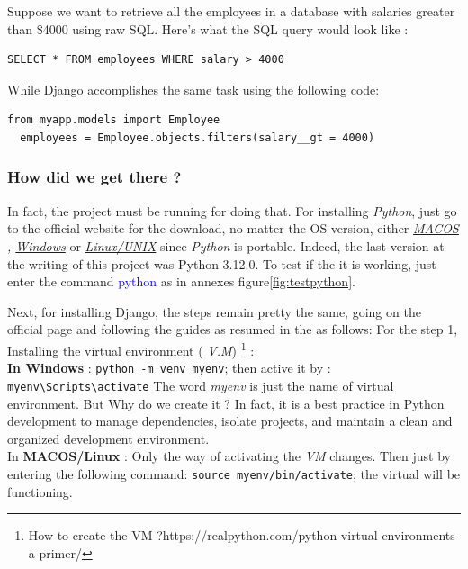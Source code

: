 \documentclass[12pt,a4paper, oneside]{book}
\begin{document}
	Suppose we want to retrieve all the employees in a database with salaries greater than \$4000 using raw SQL. Here's what the SQL query would look like : 	
\begin{lstlisting}[style=htmlcssjsstyle]
 SELECT * FROM employees WHERE salary > 4000
\end{lstlisting}
  While Django accomplishes the same task using the following code:
\begin{lstlisting}[style=stylejupyter]
from myapp.models import Employee
  employees = Employee.objects.filters(salary__gt = 4000)
\end{lstlisting}
    \subsubsection*{How did we get there ?}
   In fact, the project must be running for doing that. For installing \textit{Python}, just go to the official website for the  download, no matter the OS version, either \textit{ \href{https://www.python.org/downloads/macos/}{MACOS} , \href{https://www.python.org/downloads/windows/}{Windows} } or \href{https://www.python.org/downloads/source/}{\textit{Linux/UNIX}} since \textit{Python} is portable. Indeed, the last version at the writing of this project was Python 3.12.0. To test if the it is working, just enter the command \textcolor{blue}{python} as in annexes figure\ref{fig:testpython}.
  
   
   
   Next, for installing Django, the steps remain pretty the same, going on the official page and following the guides as resumed in the as follows:   
   For the step 1, Installing the virtual environment ( \textit{V.M}) \footnote{How to create the VM ?https://realpython.com/python-virtual-environments-a-primer/}    : \\
   
   \textbf{In Windows} : \texttt{python -m venv myenv}; then active it by : \texttt{myenv\textbackslash Scripts\textbackslash activate} \newline
   The word \textit{myenv} is just the name of virtual environment. But Why do we create it ? In fact, it is a best practice in Python development to manage dependencies, isolate projects, and maintain a clean and organized development environment. \\
    
  In \textbf{MACOS/Linux} : Only the way of activating the \textit{VM} changes. Then just by entering the following command:\newline
  \texttt{source myenv/bin/activate}; the virtual will be functioning. \\
  
\end{document}

